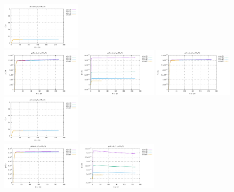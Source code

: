 \begin{center}
\includegraphics[width=4cm]{python_codes/fieldstone_126/results/model1/pt2_Ovp.pdf}\\
\includegraphics[width=4cm]{python_codes/fieldstone_126/results/model1/pt3_p.pdf}
\includegraphics[width=4cm]{python_codes/fieldstone_126/results/model1/pt3_u.pdf}
\includegraphics[width=4cm]{python_codes/fieldstone_126/results/model1/pt3_v.pdf}
\includegraphics[width=4cm]{python_codes/fieldstone_126/results/model1/pt3_Ovp.pdf}\\
\includegraphics[width=4cm]{python_codes/fieldstone_126/results/model1/pt4_p.pdf}
\includegraphics[width=4cm]{python_codes/fieldstone_126/results/model1/pt4_u.pdf}

\end{center}
